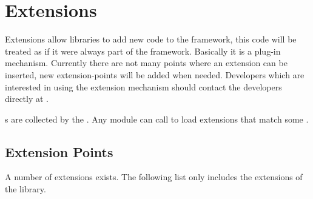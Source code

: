 \section{Extensions} \label{sec:extensions}
Extensions allow libraries to add new code to the framework, this code will be treated as if it were always part of the framework. Basically it is a plug-in mechanism. Currently there are not many points where an extension can be inserted, new extension-points will be added when needed. Developers which are interested in using the extension mechanism should contact the developers directly at .

s are collected by the . Any module can call  to load extensions that match some . 


\subsection{Extension Points}
A number of extensions exists. The following list only includes the extensions of the  library.

